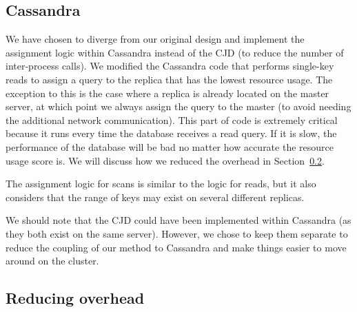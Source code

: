 \subsection{Cassandra}
We have chosen to diverge from our original design and implement the assignment logic within Cassandra instead of the CJD (to reduce the number of inter-process calls). We modified the Cassandra code that performs single-key reads to assign a query to the replica that has the lowest resource usage. The exception to this is the case where a replica is already located on the master server, at which point we always assign the query to the master (to avoid needing the additional network communication). This part of code is extremely critical because it runs every time the database receives a read query. If it is slow, the performance of the database will be bad no matter how accurate the resource usage score is. We will discuss how we reduced the overhead in Section~\ref{sec:impl_overhead}.

The assignment logic for scans is similar to the logic for reads, but it also considers that the range of keys may exist on several different replicas.

We should note that the CJD could have been implemented within Cassandra (as they both exist on the same server). However, we chose to keep them separate to reduce the coupling of our method to Cassandra and make things easier to move around on the cluster.

\subsection{Reducing overhead}
\label{sec:impl_overhead}

